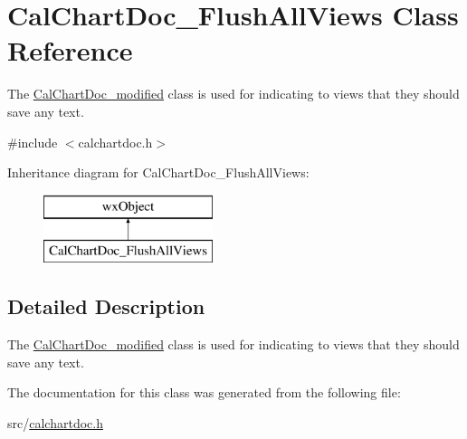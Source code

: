 \hypertarget{a00022}{\section{Cal\-Chart\-Doc\-\_\-\-Flush\-All\-Views Class Reference}
\label{a00022}
}


The \hyperlink{a00023}{Cal\-Chart\-Doc\-\_\-modified} class is used for indicating to views that they should save any text.  




{\ttfamily \#include $<$calchartdoc.\-h$>$}

Inheritance diagram for Cal\-Chart\-Doc\-\_\-\-Flush\-All\-Views\-:\begin{figure}[H]
\begin{center}
\leavevmode
\includegraphics[height=2.000000cm]{a00022}
\end{center}
\end{figure}


\subsection{Detailed Description}
The \hyperlink{a00023}{Cal\-Chart\-Doc\-\_\-modified} class is used for indicating to views that they should save any text. 

The documentation for this class was generated from the following file\-:\begin{DoxyCompactItemize}
\item 
src/\hyperlink{a00181}{calchartdoc.\-h}\end{DoxyCompactItemize}
